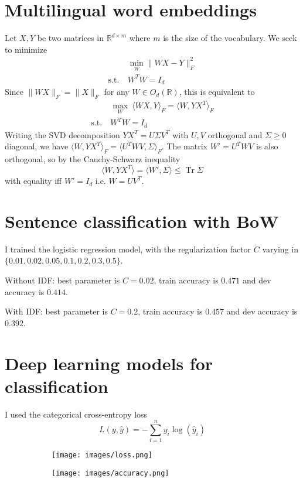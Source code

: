 \documentclass{article}
\newcommand\RR{\mathbb{R}}
\DeclareMathOperator{\trace}{\mathrm{Tr}}
\begin{document}
\section{Multilingual word embeddings}

Let $X,Y$ be two matrices in $\RR^{d\times m}$ where $m$ is the size of the vocabulary. We seek to minimize
\begin{equation}
\begin{aligned}
	&\min_W \| WX - Y \|_F^2  \\
	\mathrm{s.t.} \ & W^TW = I_d
\end{aligned}
\end{equation}
Since $\|WX\|_F = \|X\|_F$ for any $W \in O_d(\RR)$, this is equivalent to
\[
\begin{aligned}
	&\max_W~ \langle WX,Y\rangle_F = \langle W, YX^T\rangle_F  \\
	\mathrm{s.t.}\ & W^TW = I_d
\end{aligned}
\]
Writing the SVD decomposition $YX^T = U\Sigma V^T$ with $U,V$ orthogonal and $\Sigma \geq 0$ diagonal, we have $\langle W,YX^T\rangle_F = \langle U^T WV, \Sigma \rangle_F $. The matrix $W' = U^TWV$ is also orthogonal, so by the Cauchy-Schwarz inequality
\[
	\langle W, YX^T\rangle = \langle W', \Sigma \rangle \leq \trace \Sigma
\]
with equality iff $W' = I_d$ i.e. $W = UV^T$.



\section{Sentence classification with BoW}

I trained the logistic regression model, with the regularization factor $C$ varying in $\{0.01, 0.02, 0.05, 0.1, 0.2, 0.3, 0.5\}$.

Without IDF: best parameter is $C = 0.02$, train accuracy is $0.471$ and dev accuracy is $0.414$.

With IDF: best parameter is $C=0.2$, train accuracy is $0.457$ and dev accuracy is $0.392$.



\section{Deep learning models for classification}


I used the categorical cross-entropy loss
\begin{equation}
	L(y,\hat{y}) =
	-\sum_{i=1}^{n} y_i \log(\hat{y}_i)
\end{equation}

\begin{figure}[h]
	\centering
	\begin{subfigure}{.49\linewidth}
	\texttt{[image: images/loss.png]}	
	\end{subfigure}
	\begin{subfigure}{.49\linewidth}
	\texttt{[image: images/accuracy.png]}	
	\end{subfigure}
\end{figure}
\end{document}
